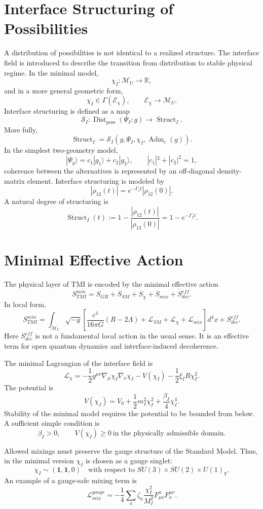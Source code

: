 \documentclass[12pt,a4paper]{article}
\DeclareMathOperator{\Adm}{Adm}
\DeclareMathOperator{\Struct}{Struct}
\DeclareMathOperator{\Dist}{Dist}
\newcommand{\M}{\mathcal M_U}
\newcommand{\Lag}{\mathcal L}
\begin{document}
\section{Interface Structuring of Possibilities}
A distribution of possibilities is not identical to a realized structure. The interface field is introduced to describe the transition from distribution to stable physical regime. In the minimal model,
\[
\boxed{\chi_I:\M\to\mathbb R,}
\]
and in a more general geometric form,
\[
\boxed{\chi_I\in\Gamma(\mathcal E_\chi),\qquad \mathcal E_\chi\to\M.}
\]
Interface structuring is defined as a map
\[
\boxed{
\mathcal S_I:\Dist_{\mathrm{poss}}(\Psi_I;g)\longrightarrow\Struct_I.
}
\]
More fully,
\[
\boxed{
\Struct_I=\mathcal S_I(g,\Psi_I,\chi_I,\Adm_c(g)).
}
\]
In the simplest two-geometry model,
\[
 |\Psi_g\rangle=c_1|g_1\rangle+c_2|g_2\rangle,
 \qquad |c_1|^2+|c_2|^2=1,
\]
coherence between the alternatives is represented by an off-diagonal density-matrix element. Interface structuring is modeled by
\[
\boxed{
 |\rho_{12}(t)|=e^{-\Gamma_I t}|\rho_{12}(0)|.
}
\]
A natural degree of structuring is
\[
\boxed{
\Struct_I(t):=1-\frac{|\rho_{12}(t)|}{|\rho_{12}(0)|}=1-e^{-\Gamma_I t}.
}
\]

\section{Minimal Effective Action}
The physical layer of TMI is encoded by the minimal effective action
\[
\boxed{S_{TMI}^{min}=S_{GR}+S_{SM}+S_\chi+S_{mix}+S_{dec}^{eff}.}
\]
In local form,
\[
\boxed{
S_{TMI}^{min}=\int_{\M}\sqrt{-g}\left[
\frac{c^4}{16\pi G}(R-2\Lambda)+\Lag_{SM}+\Lag_\chi+\Lag_{mix}
\right]d^4x+S_{dec}^{eff}.
}
\]
Here $S_{dec}^{eff}$ is not a fundamental local action in the usual sense. It is an effective term for open quantum dynamics and interface-induced decoherence.

The minimal Lagrangian of the interface field is
\[
\boxed{
\Lag_\chi=-\frac12 g^{\mu\nu}\nabla_\mu\chi_I\nabla_\nu\chi_I
-V(\chi_I)-\frac12\xi_I R\chi_I^2.
}
\]
The potential is
\[
\boxed{
V(\chi_I)=V_0+\frac12m_I^2\chi_I^2+\frac{\beta_I}{4}\chi_I^4.
}
\]
Stability of the minimal model requires the potential to be bounded from below. A sufficient simple condition is
\[
\boxed{\beta_I>0,
\qquad V(\chi_I)\geq0\ \text{in the physically admissible domain}.}
\]

Allowed mixings must preserve the gauge structure of the Standard Model. Thus, in the minimal version $\chi_I$ is chosen as a gauge singlet:
\[
\boxed{\chi_I\sim(\mathbf1,\mathbf1,0)\quad\text{with respect to }SU(3)\times SU(2)\times U(1)_Y.}
\]
An example of a gauge-safe mixing term is
\[
\boxed{
\Lag_{mix}^{gauge}=-\frac14\sum_a\zeta_a\frac{\chi_I^2}{M_I^2}F^a_{\mu\nu}F_a^{\mu\nu}.
}
\]
\end{document}
